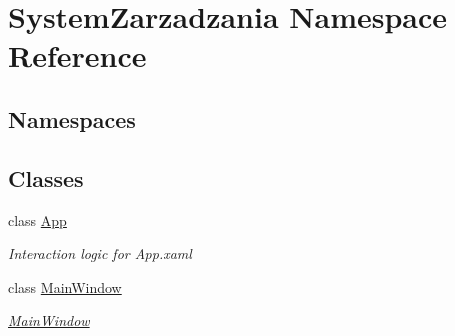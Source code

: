 \hypertarget{namespace_system_zarzadzania}{}\section{System\+Zarzadzania Namespace Reference}
\label{namespace_system_zarzadzania}
\subsection*{Namespaces}
\begin{DoxyCompactItemize}
\end{DoxyCompactItemize}
\subsection*{Classes}
\begin{DoxyCompactItemize}
\item 
class \mbox{\hyperlink{class_system_zarzadzania_1_1_app}{App}}
\begin{DoxyCompactList}\small\item\em Interaction logic for App.\+xaml \end{DoxyCompactList}\item 
class \mbox{\hyperlink{class_system_zarzadzania_1_1_main_window}{Main\+Window}}
\begin{DoxyCompactList}\small\item\em \mbox{\hyperlink{class_system_zarzadzania_1_1_main_window}{Main\+Window}} \end{DoxyCompactList}\end{DoxyCompactItemize}
